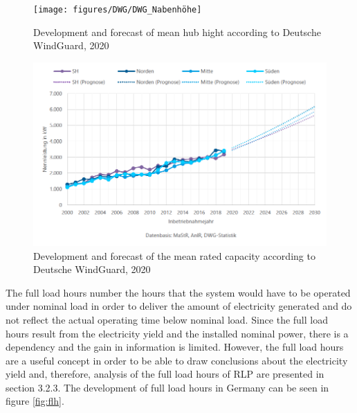 \documentclass[a4paper,11pt]{article}
\begin{document}
\begin{figure}[H]

{\centering \texttt{[image: figures/DWG/DWG\_Nabenhöhe]} 

}

\caption{Development and forecast of mean hub hight according to Deutsche WindGuard, 2020}\label{fig:nabe}
\end{figure}
\begin{figure}[H]

{\centering \includegraphics[width=1\linewidth]{figures/DWG/DWG_Nennleistung} 

}

\caption{Development and forecast of the mean rated capacity according to Deutsche WindGuard, 2020}\label{fig:capacity}
\end{figure}
The full load hours number the hours that the system would have to be operated under nominal load in order to deliver the amount of electricity generated and do not reflect the actual operating time below nominal load. Since the full load hours result from the electricity yield and the installed nominal power, there is a dependency and the gain in information is limited. However, the full load hours are a useful concept in order to be able to draw conclusions about the electricity yield and, therefore, analysis of the full load hours of RLP are presented in section 3.2.3. The development of full load hours in Germany can be seen in figure \ref{fig:flh}.
\end{document}
